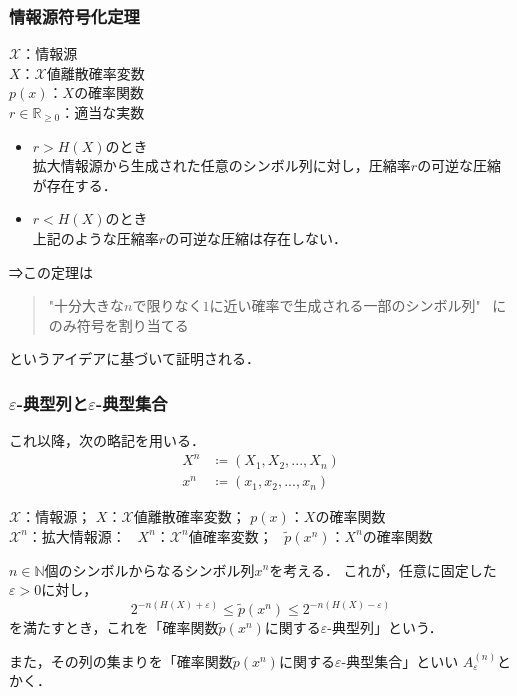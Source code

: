\documentclass{classes/myslide}
\begin{document}
\begin{frame}\frametitle{情報源符号化定理}
  \begin{theorem}[情報源符号化定理]
    $\mathcal{X}$：情報源 \\
    $X$：$\mathcal{X}$値離散確率変数 \\
    $p(x)$：$X$の確率関数 \\
    $r \in \mathbb{R}_{\geq 0}$：適当な実数 \\
    \begin{itemize}
      \item $r > H(X)$のとき \\ 拡大情報源から生成された任意のシンボル列に対し，圧縮率$r$の可逆な圧縮が存在する．
      \item $r < H(X)$のとき \\ 上記のような圧縮率$r$の可逆な圧縮は存在しない．
    \end{itemize}
  \end{theorem}
  ⇒この定理は 
  \begin{quote}
    "十分大きな$n$で限りなく$1$に近い確率で生成される一部のシンボル列" \ にのみ符号を割り当てる
  \end{quote}
  というアイデアに基づいて証明される．
\end{frame}

\begin{frame}\frametitle{$\varepsilon$-典型列と$\varepsilon$-典型集合}
  これ以降，次の略記を用いる．
  \begin{align*}
    X^n &\coloneq  (X_1, X_2, ..., X_n) \\
    x^n &\coloneq (x_1, x_2, ..., x_n )
  \end{align*}
  \begin{definition}
    $\mathcal{X}$：情報源； \quad  $X$：$\mathcal{X}$値離散確率変数； \quad $p(x)$：$X$の確率関数 \\
    $\mathcal{X}^n$：拡大情報源： \  $X^n$：$\mathcal{X}^n$値確率変数； \  $\tilde{p}(x^n)$：$X^n$の確率関数

    $n \in \mathbb{N}$個のシンボルからなるシンボル列$x^n$を考える．
    これが，任意に固定した$\varepsilon > 0$に対し，
    \[
      2^{-n(H(X) + \varepsilon)} \leq \tilde{p}(x^n) \leq  2^{-n(H(X) - \varepsilon)} 
    \]
    を満たすとき，これを「確率関数$\tilde{p}(x^n)$に関する$\varepsilon$-典型列」という．

    また，その列の集まりを「確率関数$\tilde{p}(x^n)$に関する$\varepsilon$-典型集合」といい
    $A_{\varepsilon}^{(n)}$とかく．
  \end{definition}
\end{frame}
\end{document}
